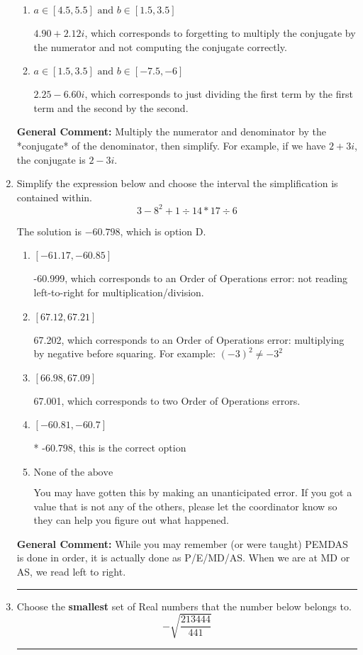 \documentclass{extbook}[14pt]
\newcommand{\litem}[1]{\item #1

\rule{\textwidth}{0.4pt}}
\begin{document}
\begin{enumerate}
{\begin{enumerate}[label=\Alph*.]
* $-3.15  + 4.32 i$, which is the correct option.
\item \( a \in [4.5, 5.5] \text{ and } b \in [1.5, 3.5] \)

 $4.90  + 2.12 i$, which corresponds to forgetting to multiply the conjugate by the numerator and not computing the conjugate correctly.
\item \( a \in [1.5, 3.5] \text{ and } b \in [-7.5, -6] \)

 $2.25  - 6.60 i$, which corresponds to just dividing the first term by the first term and the second by the second.
\end{enumerate}

\textbf{General Comment:} Multiply the numerator and denominator by the *conjugate* of the denominator, then simplify. For example, if we have $2+3i$, the conjugate is $2-3i$.
}
\litem{
Simplify the expression below and choose the interval the simplification is contained within.
\[ 3 - 8^2 + 1 \div 14 * 17 \div 6 \]

The solution is \( -60.798 \), which is option D.\begin{enumerate}[label=\Alph*.]
\item \( [-61.17, -60.85] \)

 -60.999, which corresponds to an Order of Operations error: not reading left-to-right for multiplication/division.
\item \( [67.12, 67.21] \)

 67.202, which corresponds to an Order of Operations error: multiplying by negative before squaring. For example: $(-3)^2 \neq -3^2$
\item \( [66.98, 67.09] \)

 67.001, which corresponds to two Order of Operations errors.
\item \( [-60.81, -60.7] \)

* -60.798, this is the correct option
\item \( \text{None of the above} \)

 You may have gotten this by making an unanticipated error. If you got a value that is not any of the others, please let the coordinator know so they can help you figure out what happened.
\end{enumerate}

\textbf{General Comment:} While you may remember (or were taught) PEMDAS is done in order, it is actually done as P/E/MD/AS. When we are at MD or AS, we read left to right.
}
\litem{
Choose the \textbf{smallest} set of Real numbers that the number below belongs to.
\[ -\sqrt{\frac{213444}{441}} \]

}
\end{enumerate}
\end{document}
